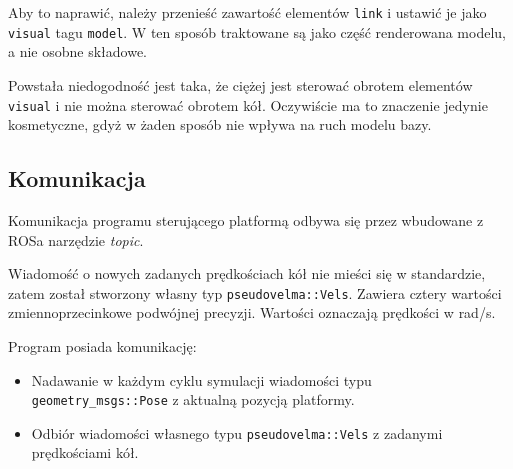 Aby to naprawić, należy przenieść zawartość elementów \texttt{link} i ustawić je jako \texttt{visual} tagu \texttt{model}.
W ten sposób traktowane są jako część renderowana modelu, a nie osobne składowe.

Powstała niedogodność jest taka, że ciężej jest sterować obrotem elementów \texttt{visual} i nie można sterować obrotem kół.
Oczywiście ma to znaczenie jedynie kosmetyczne, gdyż w żaden sposób nie wpływa na ruch modelu bazy.

\subsection{Komunikacja}
Komunikacja programu sterującego platformą odbywa się przez wbudowane z ROSa narzędzie \emph{topic}.

Wiadomość o nowych zadanych prędkościach kół nie mieści się w standardzie, zatem został stworzony własny typ \texttt{pseudovelma::Vels}.
Zawiera cztery wartości zmiennoprzecinkowe podwójnej precyzji.
Wartości oznaczają prędkości w rad/s.

Program posiada komunikację:
\begin{itemize}
 \item Nadawanie w każdym cyklu symulacji wiadomości typu \texttt{geometry\_msgs::Pose} z aktualną pozycją platformy.
 \item Odbiór wiadomości własnego typu \texttt{pseudovelma::Vels} z zadanymi prędkościami kół.
\end{itemize}

